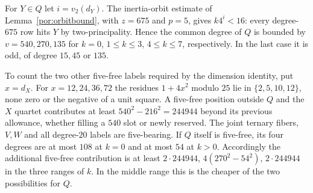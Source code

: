 \documentclass[11pt,a4paper]{article}
\numberwithin{equation}{section}
\theoremstyle{remark}
\begin{document}
For $Y\in Q$ let $i=v_2(d_Y)$. The inertia-orbit estimate of Lemma~\ref{por:orbitbound}, with $z=675$ and $p=5$, gives $k4^i<16$: every degree-$675$ row hits $Y$ by two-principality. Hence the common degree of $Q$ is bounded by $v=540,270,135$ for $k=0$, $1\le k\le3$, $4\le k\le7$, respectively. In the last case it is odd, of degree $15,45$ or $135$.

To count the two other five-free labels required by the dimension identity, put $x=d_X$. For $x=12,24,36,72$ the residues $1+4x^2$ modulo $25$ lie in $\{2,5,10,12\}$, none zero or the negative of a unit square. A five-free position outside $Q$ and the $X$ quartet contributes at least $540^2-216^2=244944$ beyond its previous allowance, whether filling a $540$ slot or newly reserved. The joint ternary fibers, $V,W$ and all degree-$20$ labels are five-bearing. If $Q$ itself is five-free, its four degrees are at most $108$ at $k=0$ and at most $54$ at $k>0$. Accordingly the additional five-free contribution is at least $2\cdot244944$, $4(270^2-54^2)$, $2\cdot244944$ in the three ranges of $k$. In the middle range this is the cheaper of the two possibilities for $Q$.
\end{document}
